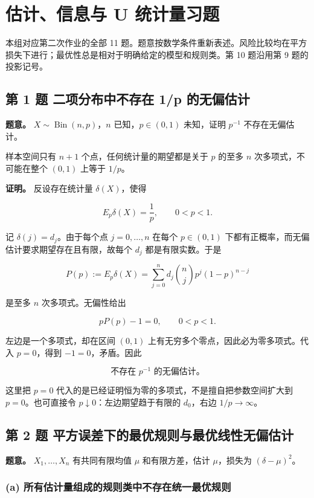 \chapter{估计、信息与 U 统计量习题}

本组对应第二次作业的全部 11 题。题意按数学条件重新表述。风险比较均在平方损失下进行；最优性总是相对于明确给定的模型和规则类。第 10 题沿用第 9 题的投影记号。

\section{第 1 题 二项分布中不存在 1/p 的无偏估计}

\textbf{题意。} $X\sim\operatorname{Bin}(n,p)$，$n$ 已知，$p\in(0,1)$ 未知，证明 $p^{-1}$ 不存在无偏估计。

 样本空间只有 $n+1$ 个点，任何统计量的期望都是关于 $p$ 的至多 $n$ 次多项式，不可能在整个 $(0,1)$ 上等于 $1/p$。

\textbf{证明。} 反设存在统计量 $\delta(X)$，使得

\[
E_p\delta(X)=\frac1p,\qquad 0<p<1.
\]

记 $\delta(j)=d_j$。由于每个点 $j=0,\ldots,n$ 在每个 $p\in(0,1)$ 下都有正概率，而无偏估计要求期望存在且有限，故每个 $d_j$ 都是有限实数。于是

\[
P(p):=E_p\delta(X)
=\sum_{j=0}^n d_j\binom nj p^j(1-p)^{n-j}
\]

是至多 $n$ 次多项式。无偏性给出

\[
pP(p)-1=0,\qquad 0<p<1.
\]

左边是一个多项式，却在区间 $(0,1)$ 上有无穷多个零点，因此必为零多项式。代入 $p=0$，得到 $-1=0$，矛盾。因此

\[
\boxed{\text{不存在 }p^{-1}\text{ 的无偏估计。}}
\]

 这里把 $p=0$ 代入的是已经证明恒为零的多项式，不是擅自把参数空间扩大到 $p=0$。也可直接令 $p\downarrow0$：左边期望趋于有限的 $d_0$，右边 $1/p\to\infty$。

\section{第 2 题 平方误差下的最优规则与最优线性无偏估计}

\textbf{题意。} $X_1,\ldots,X_n$ 有共同有限均值 $\mu$ 和有限方差，估计 $\mu$，损失为 $(\delta-\mu)^2$。

\subsection{(a) 所有估计量组成的规则类中不存在统一最优规则}

